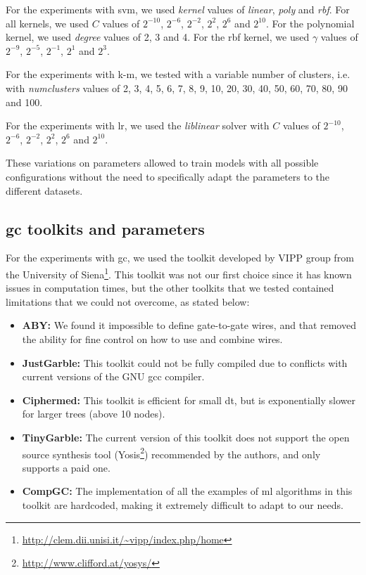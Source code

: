 For the experiments with \ac{svm}, we used \textit{kernel} values of \textit{linear}, \textit{poly} and \textit{rbf}. For all kernels, we used $C$ values of $2^{-10}$, $2^{-6}$, $2^{-2}$, $2^{2}$, $2^{6}$ and $2^{10}$. For the polynomial kernel, we used \textit{degree} values of 2, 3 and 4. For the \ac{rbf} kernel, we used $\gamma$ values of $2^{-9}$, $2^{-5}$, $2^{-1}$, $2^{1}$ and $2^{3}$.

For the experiments with \ac{k-m}, we tested with a variable number of clusters, i.e. with \textit{num\textunderscore clusters} values of 2, 3, 4, 5, 6, 7, 8, 9, 10, 20, 30, 40, 50, 60, 70, 80, 90 and 100.

For the experiments with \ac{lr}, we used the \textit{liblinear} solver with $C$ values of $2^{-10}$, $2^{-6}$, $2^{-2}$, $2^{2}$, $2^{6}$ and $2^{10}$.

 These variations on parameters allowed to train models with all possible configurations without the need to specifically adapt the parameters to the different datasets.





\subsection{\acl{gc} toolkits and parameters}

For the experiments with \ac{gc}, we used the toolkit developed by VIPP group from the University of Siena\footnote{\url{http://clem.dii.unisi.it/~vipp/index.php/home}}. This toolkit was not our first choice since it has known issues in computation times, but the other toolkits that we tested contained limitations that we could not overcome, as stated below:
\begin{itemize}
    
    \item\textbf{ABY\cite{demmler2015aby}:} We found it impossible to define gate-to-gate wires, and that removed the ability for fine control on how to use and combine wires.

    \item\textbf{JustGarble\cite{bellare2013efficient}:} This toolkit could not be fully compiled due to conflicts with current versions of the GNU gcc compiler.

    \item\textbf{Ciphermed\cite{bost2015machine}:} This toolkit is efficient for small \ac{dt}, but is exponentially slower for larger trees (above 10 nodes).

    \item\textbf{TinyGarble\cite{songhori2015tinygarble}:} The current version of this toolkit does not support the open source synthesis tool (Yosis\footnote{\url{http://www.clifford.at/yosys/}}) recommended by the authors, and only supports a paid one.

    \item\textbf{CompGC\cite{groce2016compgc}:} The implementation of all the examples of \ac{ml} algorithms in this toolkit are hardcoded, making it extremely difficult to adapt to our needs.

\end{itemize}

